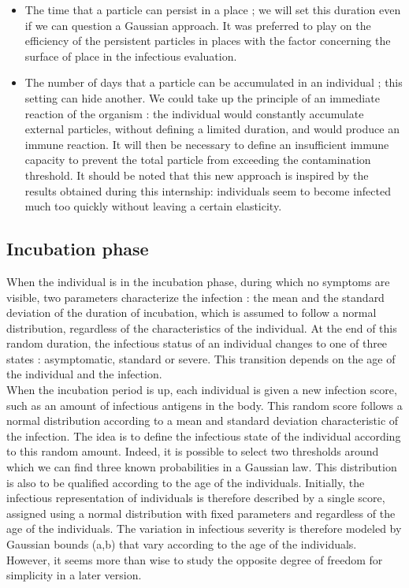 \begin{itemize}

\item The time that a particle can persist in a place ; we will set this duration even if we can question a Gaussian approach. It was preferred to play on the efficiency of the persistent particles in places with the factor concerning the surface of place in the infectious evaluation.\\

\item The number of days that a particle can be accumulated in an individual ; this setting can hide another. We could take up the principle of an immediate reaction of the organism : the individual would constantly accumulate external particles, without defining a limited duration, and would produce an immune reaction. It will then be necessary to define an insufficient immune capacity to prevent the total particle from exceeding the contamination threshold. It should be noted that this new approach is inspired by the results obtained during this internship: individuals seem to become infected much too quickly without leaving a certain elasticity.\\

\end{itemize}

\subsection{Incubation phase}

When the individual is in the incubation phase, during which no symptoms are visible, two parameters characterize the infection : the mean and the standard deviation of the duration of incubation, which is assumed to follow a normal distribution, regardless of the characteristics of the individual. At the end of this random duration, the infectious status of an individual changes to one of three states : asymptomatic, standard or severe. This transition depends on the age of the individual and the infection.\\

When the incubation period is up, each individual is given a new infection score, such as an amount of infectious antigens in the body. This random score follows a normal distribution according to a mean and standard deviation characteristic of the infection. The idea is to define the infectious state of the individual according to this random amount. Indeed, it is possible to select two thresholds around which we can find three known probabilities in a Gaussian law. This distribution is also to be qualified according to the age of the individuals. Initially, the infectious representation of individuals is therefore described by a single score, assigned using a normal distribution with fixed parameters and regardless of the age of the individuals. The variation in infectious severity is therefore modeled by Gaussian bounds (a,b) that vary according to the age of the individuals. However, it seems more than wise to study the opposite degree of freedom for simplicity in a later version.\\

